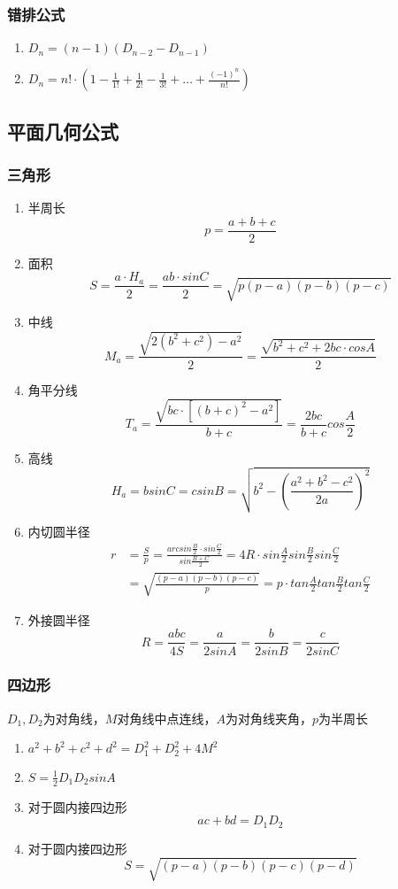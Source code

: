 \documentclass[a4paper]{article}
\begin{document}
\subsubsection{错排公式}

\begin{enumerate}
	\item $D_n = (n-1)(D_{n-2}-D_{n-1})$
	\item $D_n = n! \cdot (1-\frac{1}{1!}+\frac{1}{2!}-\frac{1}{3!}+\ldots+\frac{(-1)^n}{n!})$
\end{enumerate}

\subsection{平面几何公式}

\subsubsection{三角形}

\begin{enumerate}
	\item 半周长
		$$p=\frac{a+b+c}{2}$$
	\item 面积
		$$S=\frac{a \cdot H_a}{2}=\frac{ab \cdot sinC}{2}=\sqrt{p(p-a)(p-b)(p-c)}$$
	\item 中线
		$$M_a=\frac{\sqrt{2(b^2+c^2)-a^2}}{2}=\frac{\sqrt{b^2+c^2+2bc \cdot cosA}}{2}$$
	\item 角平分线 
		$$T_a=\frac{\sqrt{bc \cdot [(b+c)^2-a^2]}}{b+c}=\frac{2bc}{b+c}cos\frac{A}{2}$$
	\item 高线
		$$H_a=bsinC=csinB=\sqrt{b^2-(\frac{a^2+b^2-c^2}{2a})^2}$$
	\item 内切圆半径
		\begin{align*}
			r&=\frac{S}{p}=\frac{arcsin\frac{B}{2} \cdot sin\frac{C}{2}}{sin\frac{B+C}{2}}=4R \cdot sin\frac{A}{2}sin\frac{B}{2}sin\frac{C}{2}\\
			&=\sqrt{\frac{(p-a)(p-b)(p-c)}{p}}=p \cdot tan\frac{A}{2}tan\frac{B}{2}tan\frac{C}{2}
		\end{align*}
	\item 外接圆半径
		$$R=\frac{abc}{4S}=\frac{a}{2sinA}=\frac{b}{2sinB}=\frac{c}{2sinC}$$
\end{enumerate}

\subsubsection{四边形}

$D_1, D_2$为对角线，$M$对角线中点连线，$A$为对角线夹角，$p$为半周长
\begin{enumerate}
	\item $a^2+b^2+c^2+d^2=D_1^2+D_2^2+4M^2$
	\item $S=\frac{1}{2}D_1D_2sinA$
	\item 对于圆内接四边形
		$$ac+bd=D_1D_2$$
	\item 对于圆内接四边形
		$$S=\sqrt{(p-a)(p-b)(p-c)(p-d)}$$
\end{enumerate}
\end{document}
